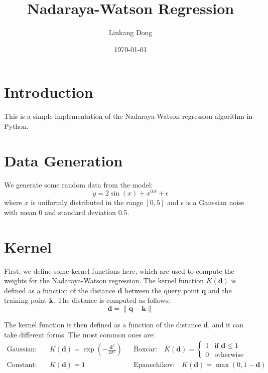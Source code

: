\documentclass{article}
\title{Nadaraya-Watson Regression}
\author{Linkang Dong} %
\date{\today}
\begin{document}
\maketitle

\section{Introduction}

This is a simple implementation of the Nadaraya-Watson regression \cite{attention_pooling, kernel_regression} algorithm in Python.

\section{Data Generation}

We generate some random data from the model:
\[
y = 2\sin(x) + x^{0.8} + \epsilon
\]
where $x$ is uniformly distributed in the range $[0, 5]$ and $\epsilon$ is a Gaussian noise with mean 0 and standard deviation 0.5.

\section{Kernel}

First, we define some kernel functions here, which are used to compute the weights for the Nadaraya-Watson regression. The kernel function $K(\mathbf{d})$ is defined as a function of the distance $\mathbf{d}$ between the query point $\mathbf{q}$ and the training point $\mathbf{k}$. The distance is computed as follows:
\begin{equation*}
    \mathbf{d} = \| \mathbf{q} - \mathbf{k} \|
\end{equation*}

The kernel function is then defined as a function of the distance $\mathbf{d}$, and it can take different forms. The most common ones are:
\begin{align*}
    \text{Gaussian:}& \quad K(\mathbf{d}) = \exp\left(- \frac{\mathbf{d}^2}{2 \sigma^2}\right)
    &&
    \text{Boxcar:} \quad K(\mathbf{d}) = \begin{cases}
        1 & \text{if } \mathbf{d} \leq 1 \\
        0 & \text{otherwise}
    \end{cases} \\     
    \text{Constant:}& \quad K(\mathbf{d}) = 1
    &&
    \text{Epanechikov:} \quad K(\mathbf{d}) = \max\left(0, 1 - \mathbf{d}\right)
\end{align*}
\end{document}
